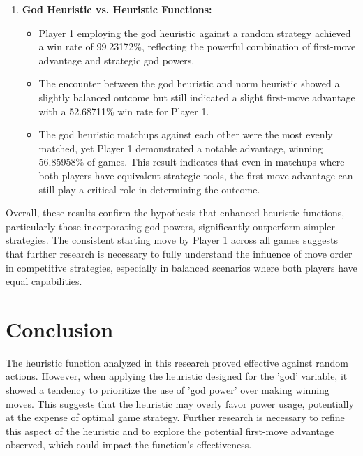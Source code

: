 \documentclass{telkomnika}
\begin{document}
\begin{enumerate}
    \item \textbf{God Heuristic vs. Heuristic Functions:}
    \begin{itemize}
        \item Player 1 employing the god heuristic against a random strategy achieved a win rate of 99.23172\%, reflecting the powerful combination of first-move advantage and strategic god powers.
        \item The encounter between the god heuristic and norm heuristic showed a slightly balanced outcome but still indicated a slight first-move advantage with a 52.68711\% win rate for Player 1.
        \item The god heuristic matchups against each other were the most evenly matched, yet Player 1 demonstrated a notable advantage, winning 56.85958\% of games. This result indicates that even in matchups where both players have equivalent strategic tools, the first-move advantage can still play a critical role in determining the outcome.
    \end{itemize}
\end{enumerate}

Overall, these results confirm the hypothesis that enhanced heuristic functions, particularly those incorporating god powers, significantly outperform simpler strategies. The consistent starting move by Player 1 across all games suggests that further research is necessary to fully understand the influence of move order in competitive strategies, especially in balanced scenarios where both players have equal capabilities.




\section{Conclusion}
\label{}
The heuristic function analyzed in this research proved effective against random actions. However, when applying the heuristic designed for the 'god' variable, it showed a tendency to prioritize the use of 'god power' over making winning moves. This suggests that the heuristic may overly favor power usage, potentially at the expense of optimal game strategy. Further research is necessary to refine this aspect of the heuristic and to explore the potential first-move advantage observed, which could impact the function's effectiveness.

\end{document}
